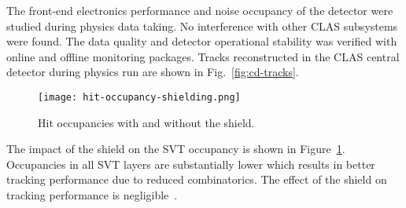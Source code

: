 The front-end electronics performance and noise occupancy of the detector were studied during physics data taking. No interference with other CLAS subsystems were found. The data quality and detector operational stability  was verified with online and offline monitoring packages. Tracks reconstructed in the CLAS central detector during physics run are shown in Fig.~\ref{fig:cd-tracks}.

\begin{figure}[hbt] 
\centering 
\texttt{[image: hit-occupancy-shielding.png]}
\caption{Hit occupancies with and without the shield.}
\label{fig:hit-occupancy-shielding}
\end{figure}

The impact of the shield on the SVT occupancy is shown in Figure~\ref{fig:hit-occupancy-shielding}. Occupancies in all SVT layers are substantially lower which results in better tracking performance due to reduced combinatorics. The effect of the shield on tracking performance is negligible~\cite{SHIELDNOTE}.


